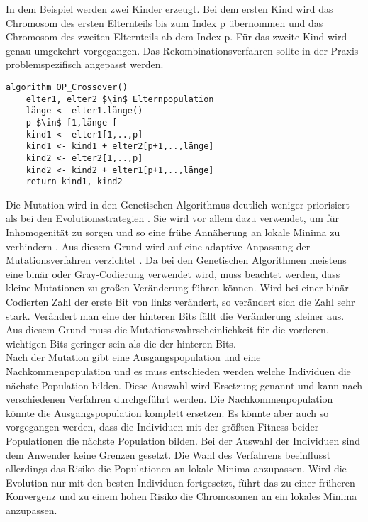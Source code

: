 In dem Beispiel werden zwei Kinder erzeugt. Bei dem ersten Kind wird das Chromosom des ersten Elternteils bis zum Index p übernommen und das Chromosom des zweiten Elternteils ab dem Index p. Für das zweite Kind wird genau umgekehrt vorgegangen. Das Rekombinationsverfahren sollte in der Praxis problemspezifisch angepasst werden.
\begin{lstlisting}[caption={One-Point-Crossover}, firstnumber=1, captionpos=b,label=lst:crossover]
algorithm OP_Crossover()
	elter1, elter2 $\in$ Elternpopulation
	länge <- elter1.länge()
	p $\in$ [1,länge [
	kind1 <- elter1[1,..,p]
	kind1 <- kind1 + elter2[p+1,..,länge]
	kind2 <- elter2[1,..,p]
	kind2 <- kind2 + elter1[p+1,..,länge]
	return kind1, kind2
\end{lstlisting}
Die Mutation wird in den Genetischen Algorithmus deutlich weniger priorisiert als bei den Evolutionsstrategien \cite[S. 200]{schoeneburg}. Sie wird vor allem dazu verwendet, um für Inhomogenität zu sorgen und so eine frühe Annäherung an lokale Minima zu verhindern \cite[S. 200]{schoeneburg}.
Aus diesem Grund wird auf eine adaptive Anpassung der Mutationsverfahren verzichtet \cite[S. 200]{schoeneburg}. Da bei den Genetischen Algorithmen meistens eine binär oder Gray-Codierung verwendet wird, muss beachtet werden, dass kleine Mutationen zu großen Veränderung führen können.
Wird bei einer binär Codierten Zahl der erste Bit von links verändert, so verändert sich die Zahl sehr stark. Verändert man eine der hinteren Bits fällt die Veränderung kleiner aus. Aus diesem Grund muss die Mutationswahrscheinlichkeit für die vorderen, wichtigen Bits geringer sein als die der hinteren Bits.\\
Nach der Mutation gibt eine Ausgangspopulation und eine Nachkommenpopulation und es muss entschieden werden welche Individuen die nächste Population bilden. Diese Auswahl wird Ersetzung genannt und kann nach verschiedenen Verfahren durchgeführt werden.
Die Nachkommenpopulation könnte die Ausgangspopulation komplett ersetzen. Es könnte aber auch so vorgegangen werden, dass die Individuen mit der größten Fitness beider Populationen die nächste Population bilden. Bei der Auswahl der Individuen sind dem Anwender keine Grenzen gesetzt. Die Wahl des Verfahrens beeinflusst allerdings das Risiko die Populationen an lokale Minima anzupassen. Wird die Evolution nur mit den besten Individuen fortgesetzt, führt das zu einer früheren Konvergenz und zu einem hohen Risiko die Chromosomen an ein lokales Minima anzupassen. 

